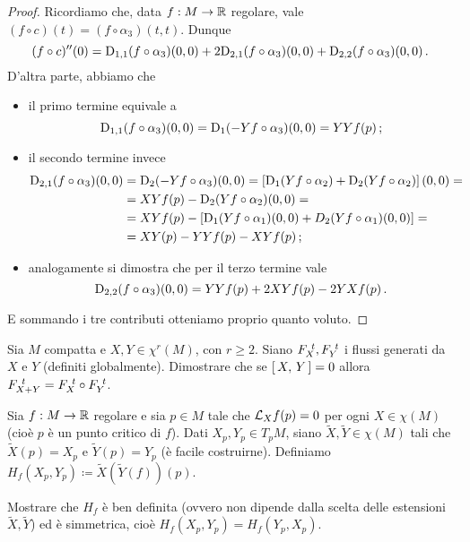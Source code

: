 \begin{proof}
	Ricordiamo che, data $f:M\to\mathbb R$ regolare, vale $(f\circ c)(t)=(f\circ\alpha_3)(t,t)$. Dunque 
	\begin{equation*}
		(f\circ c)''(0)=\mathrm D_{1,1}(f\circ\alpha_3)(0,0)+2\mathrm D_{2,1}(f\circ\alpha_3)(0,0)+\mathrm D_{2,2}(f\circ\alpha_3)(0,0)\, \text{. }
	\end{equation*}
	D'altra parte, abbiamo che
	\begin{itemize}
	 \item il primo termine equivale a
	\begin{equation*}
		\mathrm D_{1,1}(f\circ\alpha_3)(0,0)=\mathrm D_1(-Yf\circ\alpha_3)(0,0)=YYf(p)\, \text{; }
	\end{equation*}
	\item il secondo termine invece
	\begin{align*}
		\mathrm D_{2,1}(f\circ\alpha_3)(0,0) &= \mathrm D_2(-Yf\circ\alpha_3)(0,0) = \left[\mathrm D_1(Yf\circ\alpha_2)+\mathrm D_2(Yf\circ\alpha_2)\right](0,0)=
		\\ &= XYf(p)-\mathrm D_2(Yf\circ\alpha_2)(0,0)=
		\\ &= XYf(p)-[\mathrm D_1(Yf\circ\alpha_1)(0,0)+D_2(Yf\circ\alpha_1)(0,0)]=
		\\ &= XY(p)-YYf(p)-XYf(p) \, \text{; }
	\end{align*}
	\item analogamente si dimostra che per il terzo termine vale
	\begin{equation*}
		\mathrm D_{2,2}(f\circ\alpha_3)(0,0)=YYf(p)+2XYf(p)-2YXf(p) \, \text{. }
	\end{equation*}
	\end{itemize}
	E sommando i tre contributi otteniamo proprio quanto voluto.
\end{proof}

\begin{exercise}
	Sia $M$ compatta e $X,Y\in\chi^r(M)$, con $r\ge 2$. Siano $F_{X}^{\ t},F_{Y}^{\ t}$ i flussi generati da $X$ e $Y$ (definiti globalmente). Dimostrare che se $\left[\,X,\,Y\,\right]=0$ allora $F_{X+Y}^{\ t}=F_{X}^{\ t}\circ F_{Y}^{\ t}$.
\end{exercise}

\begin{exercise}
	Sia $f:M\to \mathbb R$ regolare e sia $p\in M$ tale che $\mathcal L_Xf(p)=0$ per ogni $X\in\chi(M)$ (cioè $p$ è un punto critico di $f$). Dati $X_p,Y_p\in T_pM$, siano $\tilde{X},\tilde{Y}\in\chi(M)$ tali che $\tilde{X}(p)=X_p$ e $\tilde{Y}(p)=Y_p$ (è facile costruirne). Definiamo $H_f(X_p,Y_p)\coloneqq\tilde{X}(\tilde{Y}(f))(p)$.
	
	Mostrare che $H_f$ è ben definita (ovvero non dipende dalla scelta delle estensioni $\tilde{X},\tilde{Y}$) ed è simmetrica, cioè $H_f(X_p,Y_p)=H_f(Y_p,X_p)$.
\end{exercise}
